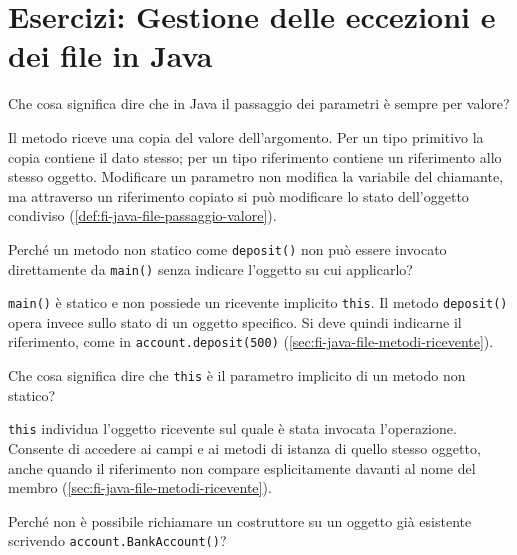 \chapter{Esercizi: Gestione delle eccezioni e dei file in Java}
\label{chap:esercizi-eccezioni-file-java}

\begin{exercise}
\label{ex:fi-esercizi-java-file-passaggio-valore}
Che cosa significa dire che in Java il passaggio dei parametri è
sempre per valore?
\end{exercise}

Il metodo riceve una copia del valore dell'argomento. Per un tipo
primitivo la copia contiene il dato stesso; per un tipo riferimento
contiene un riferimento allo stesso oggetto. Modificare un parametro
non modifica la variabile del chiamante, ma attraverso un riferimento
copiato si può modificare lo stato dell'oggetto condiviso
(\cref{def:fi-java-file-passaggio-valore}).

\begin{exercise}
\label{ex:fi-esercizi-java-file-metodo-non-statico}
Perché un metodo non statico come \texttt{deposit()} non può essere
invocato direttamente da \texttt{main()} senza indicare l'oggetto
su cui applicarlo?
\end{exercise}

\texttt{main()} è statico e non possiede un ricevente implicito
\texttt{this}. Il metodo \texttt{deposit()} opera invece sullo
stato di un oggetto specifico. Si deve quindi indicarne il
riferimento, come in \texttt{account.deposit(500)}
(\cref{sec:fi-java-file-metodi-ricevente}).

\begin{exercise}
\label{ex:fi-esercizi-java-file-this}
Che cosa significa dire che \texttt{this} è il parametro implicito
di un metodo non statico?
\end{exercise}

\texttt{this} individua l'oggetto ricevente sul quale è stata
invocata l'operazione. Consente di accedere ai campi e ai metodi
di istanza di quello stesso oggetto, anche quando il riferimento
non compare esplicitamente davanti al nome del membro
(\cref{sec:fi-java-file-metodi-ricevente}).

\begin{exercise}
\label{ex:fi-esercizi-java-file-costruttore-richiamo}
Perché non è possibile richiamare un costruttore su un oggetto
già esistente scrivendo \texttt{account.BankAccount()}?
\end{exercise}

